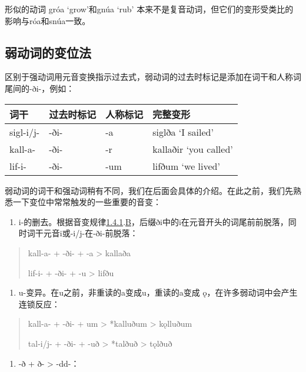形似的动词 gróa `grow‌'和gnúa `rub‌'
本来不是复音动词，但它们的变形受类比的影响与róa和snúa一致。

\subsection{弱动词的变位法}\label{ux5f31ux52a8ux8bcdux7684ux53d8ux4f4dux6cd5}

区别于强动词用元音变换指示过去式，弱动词的过去时标记是添加在词干和人称词尾间的-ði-，例如：

\begin{longtable}{llll}
\toprule
词干 & 过去时标记 & 人称标记 & 完整变形 \\
\midrule
\endhead
\bottomrule
\endfoot
sigl-i/j- & -ði- & -a & siglða `I sailed‌' \\
kall-a- & -ði- & -r & kallaðir `you called‌' \\
lif-i- & -ði- & -um & lifðum `we lived‌' \\
\end{longtable}

弱动词的词干和强动词稍有不同，我们在后面会具体的介绍。在此之前，我们先熟悉一下变位中常常触发的一些重要的音变：

\begin{enumerate}
\def\labelenumi{\arabic{enumi})}
\item
  i-的删去。根据音变规律\hyperref[ux5143ux97f3ux7684ux97f3ux53d8]{1.4.1}.\hyperref[_Ref115693879]{B}，后缀ði中的i在元音开头的词尾前前脱落，同时词干元音i或-i/j-在-ði-前脱落：
\end{enumerate}

\begin{quote}
kall-a- + -ði- + -a \textgreater{} kallaða

lif-i- + -ði- + -u \textgreater{} lifðu
\end{quote}

\begin{enumerate}
\def\labelenumi{\arabic{enumi})}
\setcounter{enumi}{1}
\item
  u-变异。在u之前，非重读的a变成u，重读的a变成
  ǫ，在许多弱动词中会产生连锁反应：
\end{enumerate}

\begin{quote}
kall-a- + -ði- + um \textgreater{} *kalluðum \textgreater{} kǫlluðum

tal-i/j- + -ði- + -uð \textgreater{} *talðuð \textgreater{} tǫlðuð
\end{quote}

\begin{enumerate}
\def\labelenumi{\arabic{enumi})}
\setcounter{enumi}{2}
\item
  -ð + ð- \textgreater{} -dd-：
\end{enumerate}

